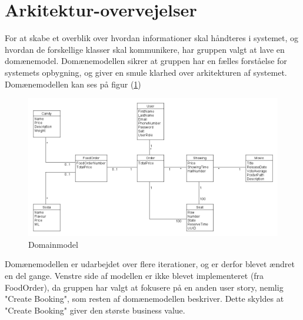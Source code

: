 \section{Arkitektur-overvejelser}\label{sec:arkitektur}
For at skabe et overblik over hvordan informationer skal håndteres i systemet,
og hvordan de forskellige klasser skal kommunikere, har gruppen valgt at lave en domænemodel.
Domænemodellen sikrer at gruppen har en fælles forståelse for systemets opbygning,
og giver en smule klarhed over arkitekturen af systemet.\\

Domænemodellen kan ses på figur (\ref{fig:domain})

\begin{figure}
    \centering
    \includegraphics[width=1\textwidth]{figures/Domainmodel.png}
    \caption{Domainmodel}
    \label{fig:domain}
\end{figure}

Domænemodellen er udarbejdet over flere iterationer, og er derfor blevet ændret en del gange.
Venstre side af modellen er ikke blevet implementeret (fra FoodOrder), da gruppen har valgt at fokusere på
en anden user story, nemlig "Create Booking", som resten af domænemodellen beskriver. Dette skyldes at "Create Booking"
giver den største business value. 